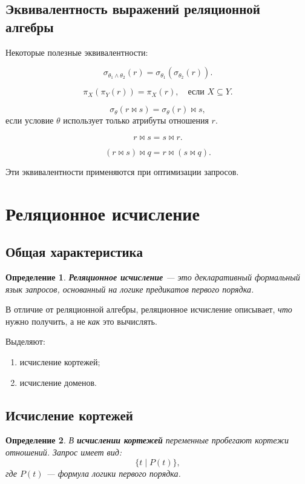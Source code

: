 \documentclass[12pt,a4paper]{article}
\newtheorem{definition}{Определение}[section]
\theoremstyle{remark}
\begin{document}
\subsection{Эквивалентность выражений реляционной алгебры}

Некоторые полезные эквивалентности:

\[
\sigma_{\theta_1 \wedge \theta_2}(r)
=
\sigma_{\theta_1}(\sigma_{\theta_2}(r)).
\]

\[
\pi_X(\pi_Y(r)) = \pi_X(r),
\quad \text{если } X \subseteq Y.
\]

\[
\sigma_\theta(r \bowtie s)
=
\sigma_\theta(r) \bowtie s,
\]
если условие $\theta$ использует только атрибуты отношения $r$.

\[
r \bowtie s = s \bowtie r.
\]

\[
(r \bowtie s) \bowtie q = r \bowtie (s \bowtie q).
\]

Эти эквивалентности применяются при оптимизации запросов.

\section{Реляционное исчисление}

\subsection{Общая характеристика}

\begin{definition}
\textbf{Реляционное исчисление} --- это декларативный формальный язык запросов, основанный на логике предикатов первого порядка.
\end{definition}

В отличие от реляционной алгебры, реляционное исчисление описывает, \emph{что} нужно получить, а не \emph{как} это вычислять.

Выделяют:
\begin{enumerate}
    \item исчисление кортежей;
    \item исчисление доменов.
\end{enumerate}

\subsection{Исчисление кортежей}

\begin{definition}
В \textbf{исчислении кортежей} переменные пробегают кортежи отношений.
Запрос имеет вид:
\[
\{t \mid P(t)\},
\]
где $P(t)$ --- формула логики первого порядка.
\end{definition}
\end{document}
